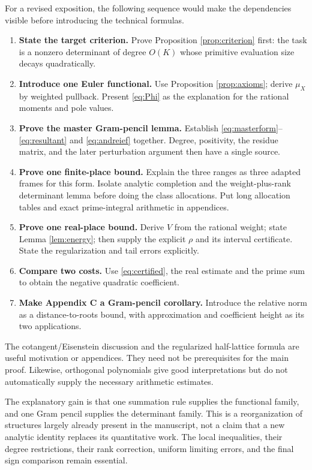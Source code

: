 \documentclass[11pt]{article}
\theoremstyle{definition}
\theoremstyle{remark}\newtheorem*{remark}{Remark}
\begin{document}
For a revised exposition, the following sequence would make the dependencies
visible before introducing the technical formulas.
\begin{enumerate}
\item \textbf{State the target criterion.} Prove Proposition
\ref{prop:criterion} first: the task is a nonzero determinant of degree $O(K)$
whose primitive evaluation size decays quadratically.
\item \textbf{Introduce one Euler functional.} Use Proposition
\ref{prop:axioms}; derive $\mu_X$ by weighted pullback. Present \eqref{eq:Phi}
as the explanation for the rational moments and pole values.
\item \textbf{Prove the master Gram-pencil lemma.} Establish
\eqref{eq:masterform}--\eqref{eq:resultant} and \eqref{eq:andreief} together.
Degree, positivity, the residue matrix, and the later perturbation argument
then have a single source.
\item \textbf{Prove one finite-place bound.} Explain the three ranges as three
adapted frames for this form. Isolate analytic completion and the
weight-plus-rank determinant lemma before doing the class allocations.
Put long allocation tables and exact prime-integral arithmetic in appendices.
\item \textbf{Prove one real-place bound.} Derive $V$ from the rational weight;
state Lemma \ref{lem:energy}; then supply the explicit $\rho$ and its interval
certificate. State the regularization and tail errors explicitly.
\item \textbf{Compare two costs.} Use \eqref{eq:certified}, the real estimate
and the prime sum to obtain the negative quadratic coefficient.
\item \textbf{Make Appendix C a Gram-pencil corollary.} Introduce the relative
norm as a distance-to-roots bound, with approximation and coefficient height
as its two applications.
\end{enumerate}

The cotangent/Eisenstein discussion and the regularized half-lattice formula
are useful motivation or appendices. They need not be prerequisites for the
main proof. Likewise, orthogonal polynomials give good interpretations but do
not automatically supply the necessary arithmetic estimates.

The explanatory gain is that one summation rule supplies the functional
family, and one Gram pencil supplies the determinant family. This is a
reorganization of structures largely already present in the manuscript,
not a claim that a new analytic identity replaces its quantitative work.
The local inequalities, their degree restrictions, their rank correction,
uniform limiting errors, and the final sign comparison remain essential.
\end{document}
